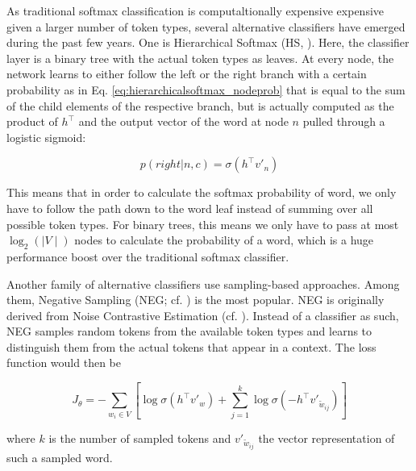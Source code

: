 \documentclass[6pt]{article}
\begin{document}
As traditional softmax classification is computaltionally expensive expensive given a larger number of token types, several alternative classifiers have emerged during the past few years. One is Hierarchical Softmax (HS, \cite{morin2005hierarchical}). Here, the classifier layer is a binary tree with the actual token types as leaves. At every node, the network learns to either follow the left or the right branch with a certain probability as in Eq. \ref{eq:hierarchicalsoftmax_nodeprob} that is equal to the sum of the child elements of the respective  branch, but is actually computed as the product of $h^\top$ and the output vector of the word at node $n$ pulled through a logistic sigmoid:

\begin{equation}
p(right|n,c) = \sigma(h^\top v'_n) 
\label{eq:hierarchicalsoftmax_nodeprob}
\end{equation}

This means that in order to calculate the softmax probability of word, we only have to follow the path down to the word leaf instead of summing over all possible token types. For binary trees, this means we only have to pass at most $\log_2(\mid V\mid)$ nodes to calculate the probability of a word, which is a huge performance boost over the traditional softmax classifier. 

Another family of alternative classifiers use sampling-based approaches. Among them, Negative Sampling (NEG; cf. \cite{goldberg2014word2vec}) is the most popular. NEG is originally derived from Noise Contrastive Estimation (cf. \cite{gutmann2010noise,mnih2012fast}). Instead of a classifier as such, NEG samples random tokens from the available token types and learns to distinguish them from the actual tokens that appear in a context. The loss function would then be

\begin{equation}
J_{\theta}  = - \sum_{w_i \in V} [\log \sigma(h^{\top}v'_w)
+ \sum_{j=1}^{k}\log \sigma(-h^{\top}v'_{\tilde{w}_{ij}})]
\label{eq:neg_sampling_3}
\end{equation}

where $k$ is the number of sampled tokens and $v'_{\tilde{w}_{ij}}$ the vector representation of such a sampled word.

\end{document}
